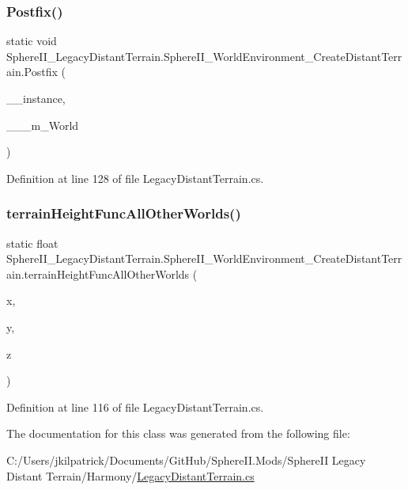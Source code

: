 \subsubsection{\texorpdfstring{Postfix()}{Postfix()}}
{\footnotesize\ttfamily static void Sphere\+I\+I\+\_\+\+Legacy\+Distant\+Terrain.\+Sphere\+I\+I\+\_\+\+World\+Environment\+\_\+\+Create\+Distant\+Terrain.\+Postfix (\begin{DoxyParamCaption}\item[{World\+Environment}]{\+\_\+\+\_\+instance,  }\item[{World}]{\+\_\+\+\_\+\+\_\+m\+\_\+\+World }\end{DoxyParamCaption})\hspace{0.3cm}{\ttfamily [static]}}



Definition at line 128 of file Legacy\+Distant\+Terrain.\+cs.

\mbox{\label{class_sphere_i_i___legacy_distant_terrain_1_1_sphere_i_i___world_environment___create_distant_terrain_a89e05a9a09ae1b05c416e7af9f8abd1d}} 
\subsubsection{\texorpdfstring{terrainHeightFuncAllOtherWorlds()}{terrainHeightFuncAllOtherWorlds()}}
{\footnotesize\ttfamily static float Sphere\+I\+I\+\_\+\+Legacy\+Distant\+Terrain.\+Sphere\+I\+I\+\_\+\+World\+Environment\+\_\+\+Create\+Distant\+Terrain.\+terrain\+Height\+Func\+All\+Other\+Worlds (\begin{DoxyParamCaption}\item[{float}]{x,  }\item[{float}]{y,  }\item[{float}]{z }\end{DoxyParamCaption})\hspace{0.3cm}{\ttfamily [static]}}



Definition at line 116 of file Legacy\+Distant\+Terrain.\+cs.



The documentation for this class was generated from the following file\+:\begin{DoxyCompactItemize}
\item 
C\+:/\+Users/jkilpatrick/\+Documents/\+Git\+Hub/\+Sphere\+I\+I.\+Mods/\+Sphere\+I\+I Legacy Distant Terrain/\+Harmony/\mbox{\hyperlink{_legacy_distant_terrain_8cs}{Legacy\+Distant\+Terrain.\+cs}}\end{DoxyCompactItemize}
